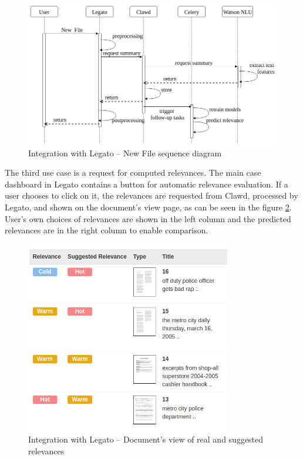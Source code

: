\documentclass[
  digital, %
  notable,   %
  nolof,     %
  nolot,     %
  draft
]{fithesis3}
\begin{document}
\begin{figure}[h]
\caption{Integration with Legato -- New File sequence diagram}
\label{fig:integration_new_file}
\includegraphics[width=\textwidth]{img/integration_new_file}
\end{figure}

The third use case is a request for computed relevances.
The main case dashboard in Legato contains a button for automatic relevance evaluation.
If a user chooses to click on it, the relevances are requested from Clawd, processed by Legato, and shown on the document's view page, as can be seen in the figure \ref{fig:integration_documentsview}.
User's own choices of relevances are shown in the left column and the predicted relevances are in the right column to enable comparison.

\begin{figure}[h]
\caption{Integration with Legato -- Document's view of real and suggested relevances}
\label{fig:integration_documentsview}
\includegraphics[width=0.8\textwidth]{img/integration_documentsview}
\end{figure}
\end{document}
